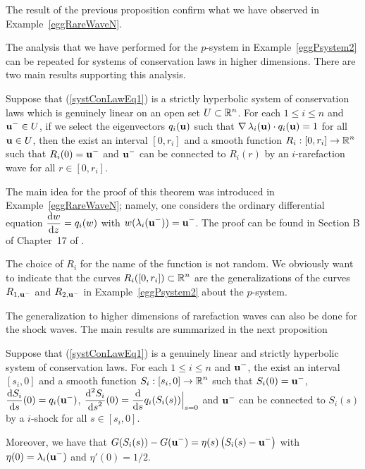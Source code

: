 The result of the previous proposition confirm what we have observed
in Example~\ref{eggRareWaveN}.

The analysis that we have performed for the $p$-system in 
Example~\ref{eggPsystem2} can be repeated for systems of conservation
laws in higher dimensions.  There are two main results supporting this
analysis.

\begin{theorem}
Suppose that (\ref{systConLawEq1}) is a strictly hyperbolic system of
conservation laws which is genuinely linear on an open set
$U \subset \RR^n$.  For each $1 \leq i \leq n$ and
$\displaystyle \VEC{u}^- \in U$,
if we select the eigenvectors $q_i(\VEC{u})$ such
that $\graD \lambda_i(\VEC{u}) \cdot q_i(\VEC{u}) = 1$ for all
$\VEC{u} \in U$, then the exist an interval $[0,r_i]$ and a smooth function
$\displaystyle R_i: [0,r_i] \to \RR^n$ such that
$\displaystyle R_i(0) = \VEC{u}^-$ and
$\displaystyle \VEC{u}^-$ can be connected to $R_i(r)$ by an
$i$-rarefaction wave for all $r \in [0,r_i]$.
\end{theorem}

The main idea for the proof of this theorem was introduced in
Example~\ref{eggRareWaveN}; namely, one considers the ordinary
differential equation $\displaystyle \dydx{w}{z} = q_i(w)$ with
$\displaystyle w(\lambda_i(\VEC{u}^-)) = \VEC{u}^-$.
The proof can be found in Section B of Chapter~17 of \cite{Smo}.

The choice of $R_i$ for the name of the function is not random.  We
obviously want to indicate that the curves
$\displaystyle R_i([0,r_i]) \subset \RR^n$
are the generalizations of the curves $R_{1,\VEC{u}^-}$ and $R_{2,\VEC{u}^-}$ in
Example~\ref{eggPsystem2} about the $p$-system.

The generalization to higher dimensions of rarefaction waves can also
be done for the shock waves.  The main results are summarized in the
next proposition

\begin{theorem}  \label{genHugCurve}
Suppose that (\ref{systConLawEq1}) is a genuinely linear and strictly
hyperbolic system of conservation laws.  For each $1 \leq i \leq n$
and $\displaystyle \VEC{u}^-$, the exist an interval $[s_i,0]$ and a
smooth function $\displaystyle S_i: [s_i,0] \to \RR^n$ such that
$\displaystyle S_i(0) = \VEC{u}^-$,
$\displaystyle \dydx{S_i}{s}(0) = q_i(\VEC{u}^-)$,
$\displaystyle \dydxn{S_i}{s}{2}(0) = \dfdx{q_i(S_i(s))}{s}\Big|_{s=0}$
and $\displaystyle \VEC{u}^-$ can be connected to $S_i(s)$ by a $i$-shock
for all $s \in [s_i,0]$.

Moreover, we have that
$\displaystyle G(S_i(s))-G(\VEC{u}^-)
= \eta(s) \left(S_i(s) - \VEC{u}^-\right)$
with $\displaystyle \eta(0) = \lambda_i(\VEC{u}^-)$ and $\eta'(0) = 1/2$.
\end{theorem}

